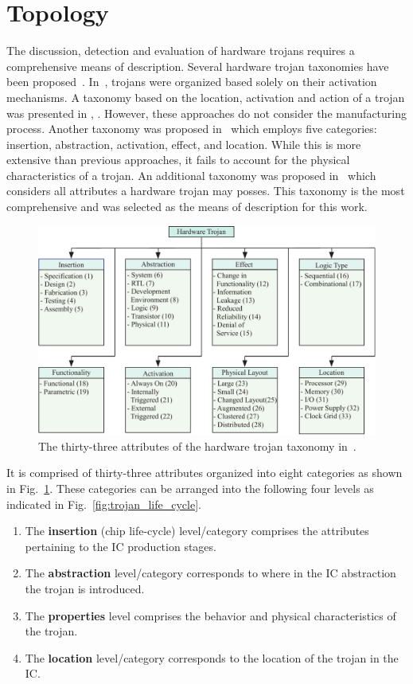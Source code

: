 \section{Topology} \label{sec:topology}
The discussion, detection and evaluation of hardware trojans requires a comprehensive means of description.
Several hardware trojan taxonomies have been proposed~\cite{taxonomy1, taxonomy2, taxonomy3, taxonomy4}.
In~\cite{taxonomy1}, trojans were organized based solely on their activation mechanisms.
A taxonomy based on the location, activation and action of a trojan was presented in \cite{taxonomy2}, \cite{taxonomy3}.
However, these approaches do not consider the manufacturing process.
Another taxonomy was proposed in~\cite{taxonomy4} which employs five categories: insertion, abstraction, activation, effect, and location.
While this is more extensive than previous approaches, it fails to account for the physical characteristics of a trojan.
An additional taxonomy was proposed in~\cite{samerAttribute} which considers all attributes a hardware trojan may posses.
This taxonomy is the most comprehensive and was selected as the means of description for this work.
\begin{figure}
	\centering
	\includegraphics[width=1.0\linewidth]{figures/HW_trojan}
	\caption{The thirty-three attributes of the hardware trojan taxonomy in~\cite{samerAttribute}.}
	\label{fig:HW_trojan}
\end{figure}
It is comprised of thirty-three attributes organized into eight categories as shown in Fig.~\ref{fig:HW_trojan}.
These categories can be arranged into the following four levels as indicated in Fig.~\ref{fig:trojan_life_cycle}.
\begin{enumerate}
	\item The \textbf{insertion} (chip life-cycle) level/category comprises the attributes pertaining to the IC production stages.
	\item The \textbf{abstraction} level/category corresponds to where in the IC abstraction the trojan is introduced.
	\item The \textbf{properties} level comprises the behavior and physical characteristics of the trojan.
	\item The \textbf{location} level/category corresponds to the location of the trojan in the IC.
\end{enumerate}

